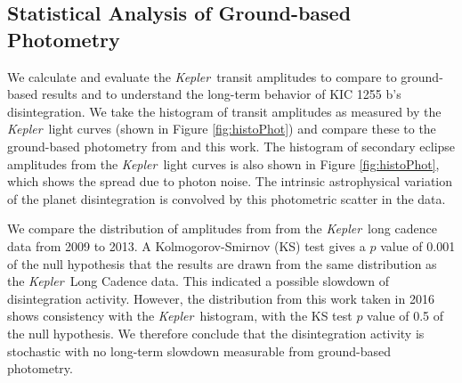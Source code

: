 \documentclass[preprint]{aastex61}
\newcommand{\sha}{KIC 1255 b}
\newcommand{\kepler}{{\it Kepler}}
\begin{document}


\subsection{Statistical Analysis of Ground-based Photometry}\label{sec:statistics}
We calculate and evaluate the \kepler\ transit amplitudes to compare to ground-based results and to understand the long-term behavior of \sha's disintegration.
We take the histogram of transit amplitudes as measured by the \kepler\ light curves (shown in Figure \ref{fig:histoPhot}) and compare these to the ground-based photometry from \citet{schlawin2016kic1255} and this work.
The histogram of secondary eclipse amplitudes from the \kepler\ light curves is also shown in Figure \ref{fig:histoPhot}, which shows the spread due to photon noise.
The intrinsic astrophysical variation of the planet disintegration is convolved by this photometric scatter in the data.

We compare the distribution of amplitudes from \citet{schlawin2016kic1255} from the \kepler\ long cadence data from 2009 to 2013.
A Kolmogorov-Smirnov (KS) test gives a $p$ value of 0.001 of the null hypothesis that the \citet{schlawin2016kic1255} results are drawn from the same distribution as the \kepler\ Long Cadence data.
This indicated a possible slowdown of disintegration activity.
However, the distribution from this work taken in 2016 shows consistency with the \kepler\ histogram, with the KS test $p$ value of 0.5 of the null hypothesis. 
We therefore conclude that the disintegration activity is stochastic with no long-term slowdown measurable from ground-based photometry.
\end{document}
